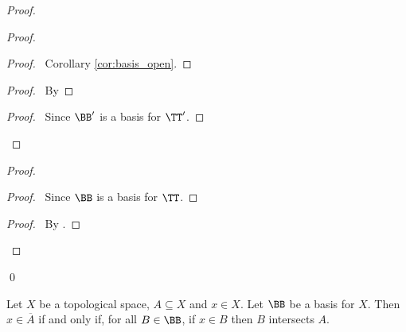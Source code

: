 \begin{proof}
    \pf
    \begin{proof}
        \begin{proof}
            \pf\ Corollary \ref{cor:basis_open}.
        \end{proof}
        \begin{proof}
            \pf\ By 
        \end{proof}
        \begin{proof}
            \pf\ Since $\BB'$ is a basis for $\TT'$.
        \end{proof}
    \end{proof}
    \begin{proof}
        \begin{proof}
            \pf\ Since $\BB$ is a basis for $\TT$.
        \end{proof}
        \begin{proof}
            \pf\ By .
        \end{proof}
    \end{proof}
    \qed
\end{proof}

\begin{theorem}
    Let $X$ be a topological space, $A \subseteq X$ and $x \in X$. Let $\BB$ be a basis for $X$. Then $x \in 
    \overline{A}$ if and only if, for all $B \in \BB$, if $x \in B$ then $B$ intersects $A$.
\end{theorem}

